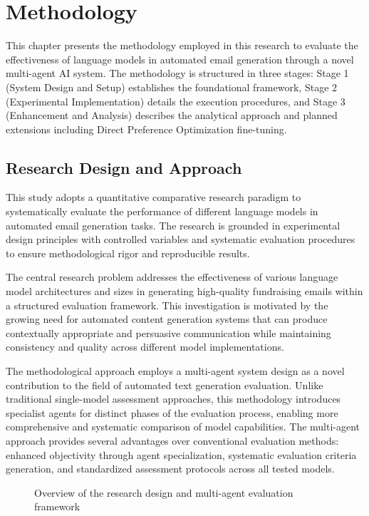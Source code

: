 \chapter{Methodology}

This chapter presents the methodology employed in this research to evaluate the effectiveness of language models in automated email generation through a novel multi-agent AI system. The methodology is structured in three stages: Stage 1 (System Design and Setup) establishes the foundational framework, Stage 2 (Experimental Implementation) details the execution procedures, and Stage 3 (Enhancement and Analysis) describes the analytical approach and planned extensions including Direct Preference Optimization fine-tuning.

\section{Research Design and Approach}
\label{sec:research-design}

This study adopts a quantitative comparative research paradigm to systematically evaluate the performance of different language models in automated email generation tasks. The research is grounded in experimental design principles with controlled variables and systematic evaluation procedures to ensure methodological rigor and reproducible results.

The central research problem addresses the effectiveness of various language model architectures and sizes in generating high-quality fundraising emails within a structured evaluation framework. This investigation is motivated by the growing need for automated content generation systems that can produce contextually appropriate and persuasive communication while maintaining consistency and quality across different model implementations.

The methodological approach employs a multi-agent system design as a novel contribution to the field of automated text generation evaluation. Unlike traditional single-model assessment approaches, this methodology introduces specialist agents for distinct phases of the evaluation process, enabling more comprehensive and systematic comparison of model capabilities. The multi-agent approach provides several advantages over conventional evaluation methods: enhanced objectivity through agent specialization, systematic evaluation criteria generation, and standardized assessment protocols across all tested models.

\begin{figure}[htbp]
    \centering
    \caption{Overview of the research design and multi-agent evaluation framework}
    \label{fig:research-design}
\end{figure}

